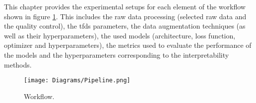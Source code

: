 
\graphicspath{{./Sections/Methodology/Resources/}}

\glsresetall

This chapter provides the experimental setups for each element of the workflow shown in figure \ref{fig:meth:pipeline}. This includes the raw data processing (selected raw data and the quality control), the \gls{tfds} parameters, the data augmentation techniques (as well as their hyperparameters), the used models (architecture, loss function, optimizer and hyperparameters), the metrics used to evaluate the performance of the models and the hyperparameters corresponding to the interpretability methods.

\begin{figure}[!ht]
  \centering
  \texttt{[image: Diagrams/Pipeline.png]}
  \caption{Workflow.}
  \label{fig:meth:pipeline}
\end{figure}
